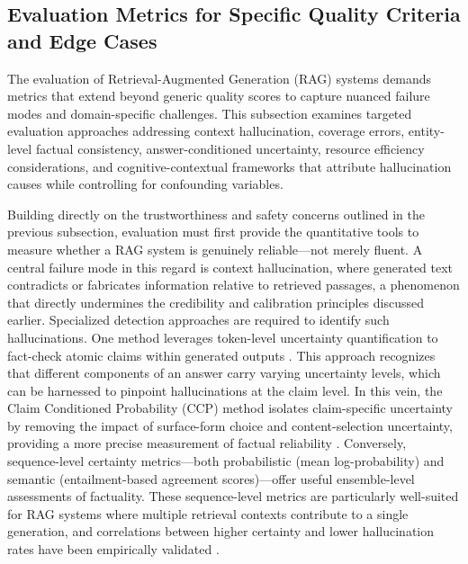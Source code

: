 \documentclass[11pt]{article}
\begin{document}
\subsection{Evaluation Metrics for Specific Quality Criteria and Edge Cases}

The evaluation of Retrieval-Augmented Generation (RAG) systems demands metrics that extend beyond generic quality scores to capture nuanced failure modes and domain-specific challenges. This subsection examines targeted evaluation approaches addressing context hallucination, coverage errors, entity-level factual consistency, answer-conditioned uncertainty, resource efficiency considerations, and cognitive-contextual frameworks that attribute hallucination causes while controlling for confounding variables.

Building directly on the trustworthiness and safety concerns outlined in the previous subsection, evaluation must first provide the quantitative tools to measure whether a RAG system is genuinely reliable---not merely fluent. A central failure mode in this regard is context hallucination, where generated text contradicts or fabricates information relative to retrieved passages, a phenomenon that directly undermines the credibility and calibration principles discussed earlier. Specialized detection approaches are required to identify such hallucinations. One method leverages token-level uncertainty quantification to fact-check atomic claims within generated outputs \cite{ref140}. This approach recognizes that different components of an answer carry varying uncertainty levels, which can be harnessed to pinpoint hallucinations at the claim level. In this vein, the Claim Conditioned Probability (CCP) method isolates claim-specific uncertainty by removing the impact of surface-form choice and content-selection uncertainty, providing a more precise measurement of factual reliability \cite{ref140}. Conversely, sequence-level certainty metrics---both probabilistic (mean log-probability) and semantic (entailment-based agreement scores)---offer useful ensemble-level assessments of factuality. These sequence-level metrics are particularly well-suited for RAG systems where multiple retrieval contexts contribute to a single generation, and correlations between higher certainty and lower hallucination rates have been empirically validated \cite{ref141}.
\end{document}
